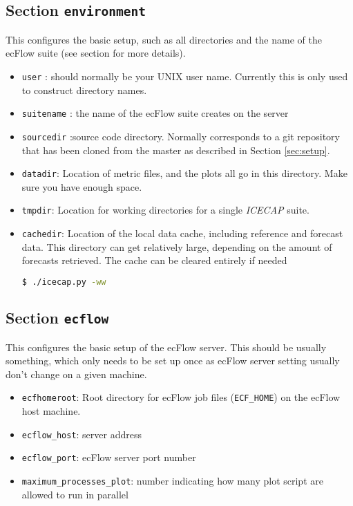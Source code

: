 \documentclass[DIV=10, parskip=full]{scrreprt}
\newcommand{\ice}{\textit{ICECAP}\xspace}
\begin{document}
\subsection{Section \texttt{environment}} \label{sec:environment}
This configures the basic setup, such as all directories and the name of the ecFlow suite (see section \label{sec:eflow} for more details).
\begin{itemize}
	\item \texttt{user} : should normally be your UNIX user name. Currently this is only used to construct directory names.
	\item \texttt{suitename} : the name of the ecFlow suite creates on the server 
	\item \texttt{sourcedir} :source code directory. Normally corresponds to a git repository that has been cloned from the master as described in Section \ref{sec:setup}.
	 \item \texttt{datadir}: Location of metric files, and the plots all go in this directory. Make sure you have enough space. 
	  \item \texttt{tmpdir}: Location for working directories for a single \ice suite.
	   \item \texttt{cachedir}: Location of the local data cache, including reference and forecast data. This directory can get relatively large, depending on the amount of forecasts retrieved. The cache can be cleared entirely if needed 
	   \begin{lstlisting}[language=bash]
	   	$ ./icecap.py -ww
	   \end{lstlisting}
\end{itemize}
	
\subsection{Section \texttt{ecflow}} \label{sec:ecflow}
This configures the basic setup of the ecFlow server. This should be usually something, which only needs to be set up once as ecFlow server setting usually don't change on a given machine.
\begin{itemize}
 	\item \texttt{ecfhomeroot}: Root directory for ecFlow job files (\texttt{ECF\_HOME}) on the ecFlow host machine.
 	\item \texttt{ecflow\_host}: server address
 	\item \texttt{ecflow\_port}: ecFlow server port number
 	\item \texttt{maximum\_processes\_plot}: number indicating how many plot script are allowed to run in parallel
 \end{itemize}
 
\end{document}
